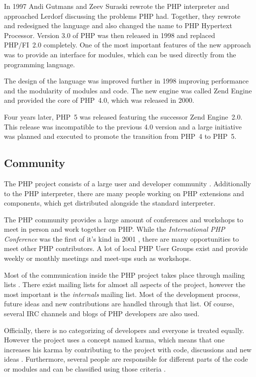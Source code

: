 In 1997 Andi Gutmans and Zeev Suraski rewrote the PHP interpreter and
approached Lerdorf discussing the problems PHP had. Together, they rewrote and
redesigned the language and also changed the name to PHP Hypertext Processor.
Version 3.0 of PHP was then released in 1998 and replaced PHP/FI~2.0
completely. One of the most important features of the new approach was to
provide an interface for modules, which can be used directly from the
programming language.

The design of the language was improved further in 1998 improving performance
and the modularity of modules and code. The new engine was called Zend Engine
and provided the core of PHP~4.0, which was released in 2000.

Four years later, PHP~5 was released featuring the successor Zend Engine~2.0.
This release was incompatible to the previous 4.0 version and a large
initiative was planned and executed to promote the transition from PHP~4 to
PHP~5.


\subsection{Community} %

The PHP project consists of a large user and developer community
\cite{Magnusson2010}. Additionally to the PHP interpreter, there are many
people working on PHP extensions and components, which get distributed
alongside the standard interpreter.

The PHP community provides a large amount of conferences and workshops to meet
in person and work together on PHP. While the \emph{International PHP
Conference} was the first of it's kind in 2001 \cite{PHPConferences}, there are
many opportunities to meet other PHP contributors. A lot of local PHP User
Groups exist and provide weekly or monthly meetings and meet-ups such as
workshops.

Most of the communication inside the PHP project takes place through mailing
lists \cite{Magnusson2010}. There exist mailing lists for almost all aspects of
the project, however the most important is the \emph{internals} mailing list.
Most of the development process, future ideas and new contributions are handled
through that list. Of course, several \ac{IRC} channels and blogs of PHP
developers are also used.

Officially, there is no categorizing of developers and everyone is treated
equally. However the project uses a concept named karma, which means
that one increases his karma by contributing to the project with code,
discussions and new ideas \cite{Magnusson2010}. Furthermore, several people are
responsible for different parts of the code or modules and can be classified
using those criteria \cite{PHPCredits}.

